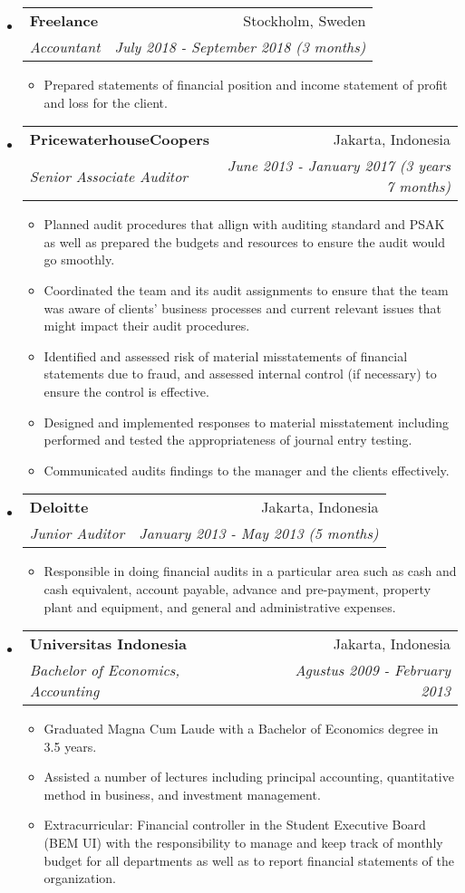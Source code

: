 \documentclass[letterpaper,10pt]{article}
\makeatletter
\newlength{\outerbordwidth}
\newcommand{\resitem}[1]{\item #1 \vspace{-2pt}}
\newcommand{\resheading}[1]{\vspace{8pt}
  \parbox{\textwidth}{\setlength{\FrameSep}{\outerbordwidth}
    \begin{shaded}

\setlength{\fboxsep}{0pt}\framebox[\textwidth][l]{\setlength{\fboxsep}{4pt}\fcolorbox{shadecolorB}{shadecolorB}{\textbf{\sffamily{\mbox{~}\makebox[6.762in][l]{\large #1} \vphantom{p\^{E}}}}}}
    \end{shaded}
  }\vspace{-5pt}
}
\newcommand{\ressubheading}[4]{
\begin{tabular*}{6.5in}{l@{\cftdotfill{\cftsecdotsep}\extracolsep{\fill}}r}
		\textbf{#1} & #2 \\
		\textit{#3} & \textit{#4} \\
\end{tabular*}\vspace{-6pt}}
\makeatother
\begin{document}
\begin{itemize}
\item
\ressubheading{Freelance}{Stockholm, Sweden}{Accountant}{July 2018 - September 2018 (3 months)}
\begin{itemize}
  \resitem{Prepared statements of financial position and income statement of profit and loss for the client.}
\end{itemize}

\item
	\ressubheading{PricewaterhouseCoopers}{Jakarta, Indonesia}{Senior Associate Auditor}{June 2013 - January 2017 (3 years 7 months)}
  \begin{itemize}
    \resitem{Planned audit procedures that allign with auditing standard and PSAK as well as prepared the budgets and resources to ensure the audit would go smoothly.}
    \resitem{Coordinated the team and its audit assignments to ensure that the team was aware of clients' business processes and current relevant issues that might impact their audit procedures.}
    \resitem{Identified and assessed risk of material misstatements of financial statements due to fraud, and assessed internal control (if necessary) to ensure the control is effective.}
    \resitem{Designed and implemented responses to material misstatement including performed and tested the appropriateness of  journal entry testing.}
    \resitem{Communicated audits findings to the manager and the clients effectively.}
	\end{itemize}

\item
	\ressubheading{Deloitte}{Jakarta, Indonesia}{Junior Auditor}{January 2013 - May 2013 (5 months)}
  \begin{itemize}
    \resitem{Responsible in doing financial audits in a particular area such as cash and cash equivalent, account payable, advance and pre-payment, property plant and equipment, and general and administrative expenses.}
	\end{itemize}

\end{itemize}


\resheading{Education}


\begin{itemize}

\item
	\ressubheading{Universitas Indonesia}{Jakarta, Indonesia}{Bachelor of Economics, Accounting}{Agustus 2009 - February 2013}
	\begin{itemize}
    \resitem{Graduated Magna Cum Laude with a Bachelor of Economics degree in 3.5 years.}
    \resitem{Assisted a number of lectures including principal accounting, quantitative method in business, and investment management.}
    \resitem{Extracurricular: Financial controller in the Student Executive Board (BEM UI) with the responsibility to manage and keep track of monthly budget for all departments as well as to report financial statements of the organization.}
	\end{itemize}

\end{itemize}
\end{document}
